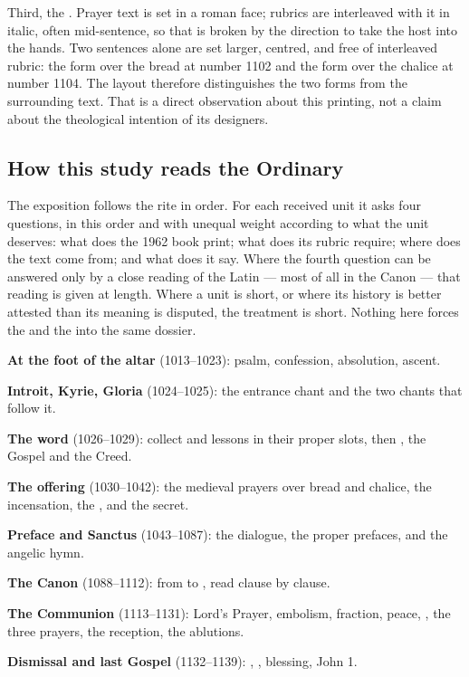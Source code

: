 Third, the . Prayer text is set in a roman face;
rubrics are interleaved with it in italic, often mid-sentence, so that
 is broken by the direction to take the
host into the hands. Two sentences alone are set larger, centred, and free of
interleaved rubric: the form over the bread at number 1102 and the form over
the chalice at number 1104. The layout therefore distinguishes the two forms
from the surrounding text. That is a direct observation about this printing,
not a claim about the theological intention of its designers.

\subsection*{How this study reads the Ordinary}

The exposition follows the rite in order. For each received unit it asks four
questions, in this order and with unequal weight according to what the unit
deserves: what does the 1962 book print; what does its rubric require; where
does the text come from; and what does it say. Where the fourth question can be
answered only by a close reading of the Latin --- most of all in the Canon ---
that reading is given at length. Where a unit is short, or where its history is
better attested than its meaning is disputed, the treatment is short. Nothing
here forces the  and the  into the same
dossier.

\begin{movementlist}
\item \textbf{At the foot of the altar} (1013--1023): psalm, confession,
absolution, ascent.
\item \textbf{Introit, Kyrie, Gloria} (1024--1025): the entrance chant and the
two chants that follow it.
\item \textbf{The word} (1026--1029): collect and lessons in their proper
slots, then , the Gospel and the Creed.
\item \textbf{The offering} (1030--1042): the medieval prayers over bread and
chalice, the incensation, the ,  and
the secret.
\item \textbf{Preface and Sanctus} (1043--1087): the dialogue, the proper
prefaces, and the angelic hymn.
\item \textbf{The Canon} (1088--1112): from  to
, read clause by clause.
\item \textbf{The Communion} (1113--1131): Lord's Prayer, embolism, fraction,
peace, , the three prayers, the reception, the ablutions.
\item \textbf{Dismissal and last Gospel} (1132--1139): , , blessing, John 1.
\end{movementlist}

